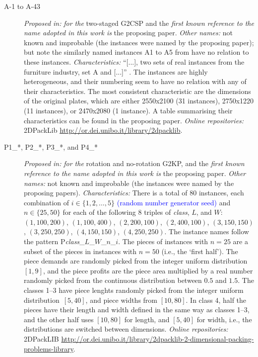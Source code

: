 \documentclass[ppgc,tese,english,formais,babel]{iiufrgs}
\newif\iffinalversion
\newcommand{\newtext}[1]{\iffinalversion%
#1%
\else%
\textcolor{blue}{#1}%
\fi%
}
\begin{document}
\begin{description}
\item[A-1 to A-43] \emph{Proposed in:} \citet{macedo:2010} \emph{for the} two-staged G2CSP and the \emph{first known reference to the name adopted in this work is} the proposing paper. \emph{Other names:} not known and improbable (the instances were named by the proposing paper); but note the similarly named instances A1 to A5 from \citet{hifi:1997} have no relation to these instances. \emph{Characteristics:} ``[...],  two sets of real instances from the furniture industry, set A and [...]'' \citep[p. 7]{macedo:2010}. The instances are highly heterogeneous, and their numbering seem to have no relation with any of their characteristics. The most consistent characteristic are the dimensions of the original plates, which are either 2550x2100 (31 instances), 2750x1220 (11 instances), or 2470x2080 (1 instance). A table summarising their characteristics can be found in the proposing paper. \emph{Online repositories:} 2DPackLib \url{http://or.dei.unibo.it/library/2dpacklib}.
\item [P1\_*, P2\_*, P3\_*, and P4\_*] \emph{Proposed in:} \citet{velasco:2019} \emph{for the} rotation and no-rotation G2KP, and the \emph{first known reference to the name adopted in this work is} the proposing paper. \emph{Other names:} not known and improbable (the instances were named by the proposing papers). \emph{Characteristics: } There is a total of 80 instances, each combination of \(i \in \{1, 2, \dots, 5\}\) \newtext{(random number generator seed)} and \(n \in \{25, 50\}\) for each of the following 8 triples of \emph{class}, \(L\), and \(W\): \((1, 100, 200)\), \((1, 100, 400)\), \((2, 200, 100)\), \((2, 400, 100)\), \((3, 150, 150)\), \((3, 250, 250)\), \((4, 150, 150)\), \((4, 250, 250)\). The instance names follow the pattern P\emph{class}\_\(L\)\_\(W\)\_\(n\)\_\(i\). The pieces of instances with \(n = 25\) are a subset of the pieces in instances with \(n = 50\) (i.e., the `first half'). The piece demands are randomly picked from the integer uniform distribution~\([1, 9]\), and the piece profits are the piece area multiplied by a real number randomly picked from the continuous distribution between \(0.5\) and \(1.5\). The classes 1--3 have piece lenghts randomly picked from the integer uniform distribution~\([5, 40]\), and piece widths from \([10, 80]\). In class 4, half the pieces have their length and width defined in the same way as classes 1--3, and the other half uses \([10, 80]\) for length, and \([5, 40]\) for width, i.e., the distributions are switched between dimensions. \emph{Online repositories:} 2DPackLIB \url{http://or.dei.unibo.it/library/2dpacklib-2-dimensional-packing-problems-library}.

\end{description}
\end{document}

